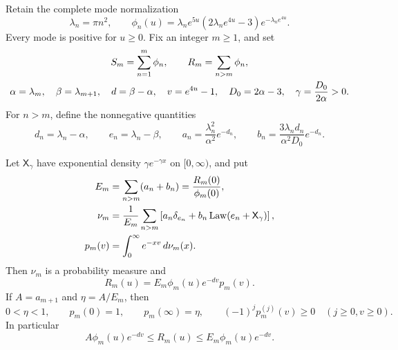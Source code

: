Retain the complete mode normalization
\[
 \lambda_n=\pi n^2,\qquad
 \phi_n(u)=\lambda_ne^{5u}(2\lambda_ne^{4u}-3)
                              e^{-\lambda_ne^{4u}}.
\]
Every mode is positive for $u\ge0$.  Fix an integer $m\ge1$, and set
\begin{gather}
 S_m=\sum_{n=1}^m\phi_n,\qquad R_m=\sum_{n>m}\phi_n,\notag\\
 \alpha=\lambda_m,\quad\beta=\lambda_{m+1},\quad d=\beta-\alpha,
 \quad v=e^{4u}-1,\quad D_0=2\alpha-3,\quad
 \gamma=\frac{D_0}{2\alpha}>0.\notag
\end{gather}
For $n>m$, define the nonnegative quantities
\begin{equation}
 d_n=\lambda_n-\alpha,\qquad e_n=\lambda_n-\beta,
 \qquad
 a_n=\frac{\lambda_n^2}{\alpha^2}e^{-d_n},\qquad
 b_n=\frac{3\lambda_nd_n}{\alpha^2D_0}e^{-d_n}.
 \label{s:tail-masses}
\end{equation}

\begin{proposition}
\label{s:laplace-law}
Let $\mathsf X_\gamma$ have exponential density
$\gamma e^{-\gamma x}$ on $[0,\infty)$, and put
\begin{align}
 E_m&=\sum_{n>m}(a_n+b_n)=\frac{R_m(0)}{\phi_m(0)},\notag\\
 \nu_m&=\frac1{E_m}\sum_{n>m}
       \left[a_n\delta_{e_n}
                +b_n\operatorname{Law}(e_n+\mathsf X_\gamma)\right],
 \label{s:tail-probability}\\
 p_m(v)&=\int_0^\infty e^{-xv}\,d\nu_m(x).
 \label{s:laplace-transform}
\end{align}
Then $\nu_m$ is a probability measure and
\begin{equation}
 R_m(u)=E_m\phi_m(u)e^{-dv}p_m(v).
 \label{s:exact-tail}
\end{equation}
If $A=a_{m+1}$ and $\eta=A/E_m$, then
\[
 0<\eta<1,\qquad p_m(0)=1,\qquad p_m(\infty)=\eta,
 \qquad (-1)^jp_m^{(j)}(v)\ge0\quad(j\ge0,v\ge0).
\]
In particular
\begin{equation}
 A\phi_m(u)e^{-dv}\le R_m(u)\le E_m\phi_m(u)e^{-dv}.
 \label{s:tail-envelope}
\end{equation}
\end{proposition}

